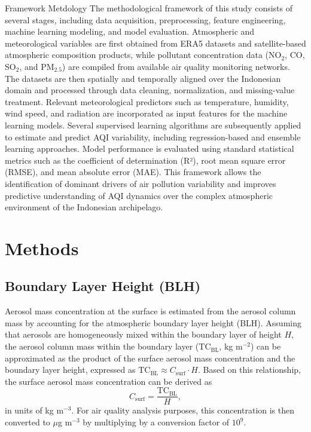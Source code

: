 \documentclass[pdflatex,sn-mathphys-num]{sn-jnl}%
\theoremstyle{thmstyleone}%
\theoremstyle{thmstyletwo}%
\theoremstyle{thmstylethree}%
\begin{document}
Framework Metdology
The methodological framework of this study consists of several stages, including data acquisition, preprocessing, feature engineering, machine learning modeling, and model evaluation. Atmospheric and meteorological variables are first obtained from ERA5 datasets and satellite-based atmospheric composition products, while pollutant concentration data (NO$_2$, CO, SO$_2$, and PM$_{2.5}$) are compiled from available air quality monitoring networks. The datasets are then spatially and temporally aligned over the Indonesian domain and processed through data cleaning, normalization, and missing-value treatment. Relevant meteorological predictors such as temperature, humidity, wind speed, and radiation are incorporated as input features for the machine learning models. Several supervised learning algorithms are subsequently applied to estimate and predict AQI variability, including regression-based and ensemble learning approaches. Model performance is evaluated using standard statistical metrics such as the coefficient of determination (R²), root mean square error (RMSE), and mean absolute error (MAE). This framework allows the identification of dominant drivers of air pollution variability and improves predictive understanding of AQI dynamics over the complex atmospheric environment of the Indonesian archipelago.

\section{Methods}\label{sec3}

\subsection{Boundary Layer Height (BLH)}
Aerosol mass concentration at the surface is estimated from the aerosol column mass by accounting for the atmospheric boundary layer height (BLH). Assuming  that aerosols are homogeneously mixed within the boundary layer of height $H$, the aerosol column mass within the boundary layer ($\mathrm{TC}_{\mathrm{BL}}$, kg m$^{-2}$) can be approximated as the product of the surface aerosol mass 
concentration and the boundary layer height, expressed as  $\mathrm{TC}_{\mathrm{BL}} \approx C_{\mathrm{surf}} \cdot H$. Based on this relationship, the surface aerosol mass concentration can be derived as
\begin{equation}
C_{\mathrm{surf}} = \frac{\mathrm{TC}_{\mathrm{BL}}}{H},
\end{equation}
in units of kg m$^{-3}$. For air quality analysis purposes, this concentration is then converted to $\mu$g m$^{-3}$ by multiplying by a conversion factor of $10^{9}$.
\end{document}
